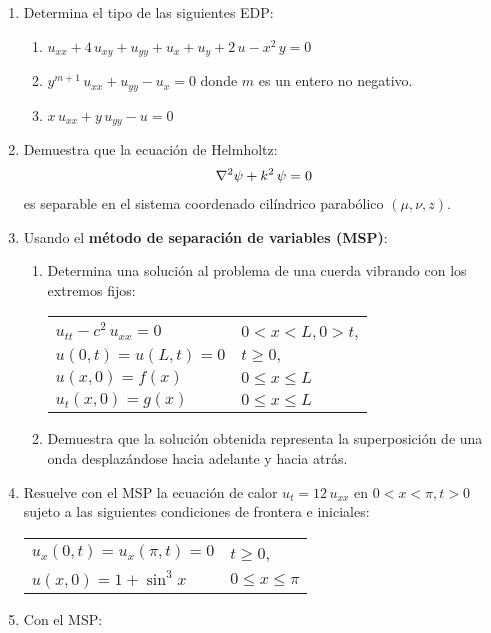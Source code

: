 \begin{enumerate}
\item Determina el tipo de las siguientes EDP:
\begin{enumerate}
\item $u_{xx} + 4 \, u_{xy} + u_{yy} +u_{x} + u_{y} + 2 \, u - x^{2} \, y = 0$
\item $y^{m+1} \, u_{xx} + u_{yy} - u_{x} = 0$ donde $m$ es un entero no negativo.
\item $x \, u_{xx} + y \, u_{yy} - u = 0$
\end{enumerate}
\item Demuestra que la ecuación de Helmholtz:
\begin{align*}
\laplacian{\psi} + k^{2} \, \psi = 0
\end{align*}
es separable en el sistema coordenado cilíndrico parabólico $(\mu, \nu, z)$.
\item Usando el \textbf{método de separación de variables (MSP)}:\begin{enumerate}
\item Determina una solución al problema de una cuerda vibrando con los extremos fijos:
\begin{table}[H]
\centering
\begin{tabular}{ l l}
$u_{tt} - c^{2} \, u_{xx} = 0$ & $0 < x < L, 0 > t$, \\
$u(0,t) = u(L, t) = 0$ & $t \geq 0,$ \\
$u(x, 0) = f(x)$ & $0 \leq x \leq L$ \\
$u_{t}(x, 0) = g(x)$ & $0 \leq x \leq L$
\end{tabular}
\end{table}
\item Demuestra que la solución obtenida representa la superposición de una onda desplazándose hacia adelante y hacia atrás.
\end{enumerate}
\item Resuelve con el MSP la ecuación de calor $u_{t} = 12 \, u_{xx}$ en $0 < x < \pi, t > 0$ sujeto a las siguientes condiciones de frontera e iniciales:
\begin{table}[H]
\centering
\begin{tabular}{l l}
$u_{x} (0, t) = u_{x} (\pi, t) = 0$ & $t \geq 0$, \\
$u(x, 0) = 1 + \sin^{3} x$ & $0 \leq x \leq \pi$
\end{tabular}
\end{table}
\item Con el MSP: 

\end{enumerate}
